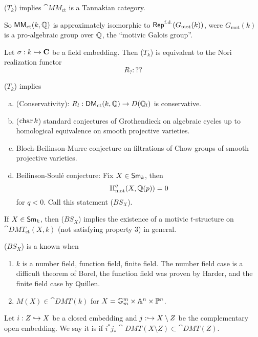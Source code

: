 \begin{lemma}
	($T_k$) implies $\cat{MM}_{\text{ct}}$ is a Tannakian category.
\end{lemma}
So $\mathsf{MM}_{\text{ct}}(k,\mathbb Q)$ is approximately isomorphic to $\mathsf{Rep}^{\text{f.d.}}(G_\text{mot}(k))$, were $G_{\text{mot}}(k)$ is a pro-algebraic group over $\mathbb Q$, the ``motivic Galois group''.

\begin{proposition}
	Let $\sigma:k\hookrightarrow \mathbf{C}$ be a field embedding. Then ($T_k$) is equivalent to the Nori realization functor
	\[
	R_{?} : ??
	\] 
\end{proposition}
\begin{theorem}
	($T_k$) implies
	\begin{enumerate}[a)]
		\item (Conservativity): $R_l:\cat{DM}_{\text{ct}}(k,\Q)\to D(\Q_l)$ is conservative.
		\item ($\operatorname{char} k$) standard conjectures of Grothendieck on algebraic cycles up to homological equivalence on smooth projective varieties.
		\item Bloch-Beilinson-Murre conjecture on filtrations of Chow groups of smooth projective varieties.
		\item Beilinson-Soul\'e conjecture: Fix $X\in \mathsf{Sm}_k$, then
			\[
			\mathrm{H}_{\text{mot}}^{q}(X,\mathbb Q(p)) = 0
			\] 
			for $q<0$. Call this statement ($BS_X$).
	\end{enumerate}
\end{theorem}
\begin{theorem}[Levine]
	If $X\in \mathsf{Sm}_k$, then ($BS_X$) implies the existence of a motivic $t$-structure on $\cat{DMT}_{\text{ct}}(X,k)$ (not satisfying property 3) in general.
\end{theorem}
\begin{theorem}
	($BS_X$) is a known when
	\begin{enumerate}[1)]
		\item $k$ is a number field, function field, finite field. The number field case is a difficult theorem of Borel, the function field was proven by Harder, and the finite field case by Quillen.
		\item $M(X)\in \cat{DMT}(k)$ for $X=\mathbb{G}_m^{m}\times \mathbb A^{n}\times \mathbb{P}^{n}$.
	\end{enumerate}
\end{theorem}
\begin{definition}
	Let $i:Z\hookrightarrow X$ be a closed embedding and $j:\hookrightarrow X\setminus Z$ be the complementary open embedding. We say it is  if $i^{*}j_*\cat{DMT}(X\setminus Z)\subset \cat{DMT}(Z)$.
\end{definition}



